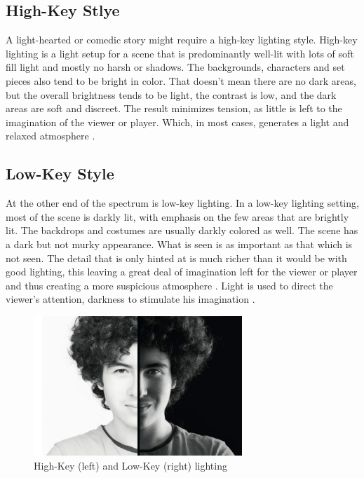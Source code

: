 \subsection{High-Key Stlye}
A light-hearted or comedic story might require a high-key lighting style. High-key lighting is a light setup for a scene that is predominantly well-lit with lots of soft fill light and mostly no harsh or shadows. The backgrounds, characters and set pieces also tend to be bright in color. That doesn't mean there are no dark areas, but the overall brightness tends to be light, the contrast is low, and the dark areas are soft and discreet. The result minimizes tension, as little is left to the imagination of the viewer or player\cite{Niedenthal1404353}. Which, in most cases, generates a light and relaxed atmosphere \cite{Storytelling}.

\subsection{Low-Key Style}
At the other end of the spectrum is low-key lighting. In a low-key lighting setting, most of the scene is darkly lit, with emphasis on the few areas that are brightly lit. The backdrops and costumes are usually darkly colored as well. The scene has a dark but not murky appearance. What is seen is as important as that which is not seen. The detail that is only hinted at is much richer than it would be with good lighting, this leaving a great deal of imagination left for the viewer or player and thus creating a more suspicious atmosphere \cite{Niedenthal1404353}. Light is used to direct the viewer's attention, darkness to stimulate his imagination \cite{Storytelling}.

\begin{figure}[H]
	\centering
		\includegraphics[width=0.7\textwidth]{Bilder/LowHighKey.jpg}
	\caption{High-Key (left) and Low-Key (right) lighting \cite{heisse}}
	\label{fig:cookie}
\end{figure}

